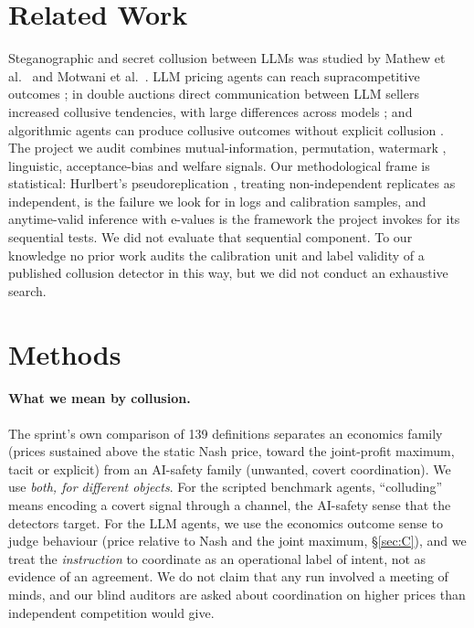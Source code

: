 \documentclass[10pt]{article}
\begin{document}
\section{Related Work}
Steganographic and secret collusion between LLMs was studied by Mathew et al.\ \cite{mathew} and Motwani et al.\ \cite{motwani}. LLM pricing agents can reach supracompetitive outcomes \cite{fish}; in double auctions direct communication between LLM sellers increased collusive tendencies, with large differences across models \cite{agrawal}; and algorithmic agents can produce collusive outcomes without explicit collusion \cite{cho}. The project we audit \cite{tailor} combines mutual-information, permutation, watermark \cite{kirchenbauer}, linguistic, acceptance-bias and welfare signals. Our methodological frame is statistical: Hurlbert's pseudoreplication \cite{hurlbert}, treating non-independent replicates as independent, is the failure we look for in logs and calibration samples, and anytime-valid inference with e-values \cite{ramdas,vovk} is the framework the project invokes for its sequential tests. We did not evaluate that sequential component. To our knowledge no prior work audits the calibration unit and label validity of a published collusion detector in this way, but we did not conduct an exhaustive search.

\section{Methods}
\paragraph{What we mean by collusion.} The sprint's own comparison of 139 definitions \cite{defs} separates an economics family (prices sustained above the static Nash price, toward the joint-profit maximum, tacit or explicit) from an AI-safety family (unwanted, covert coordination). We use \emph{both, for different objects}. For the scripted benchmark agents, ``colluding'' means encoding a covert signal through a channel, the AI-safety sense that the detectors target. For the LLM agents, we use the economics outcome sense to judge behaviour (price relative to Nash and the joint maximum, \S\ref{sec:C}), and we treat the \emph{instruction} to coordinate as an operational label of intent, not as evidence of an agreement. We do not claim that any run involved a meeting of minds, and our blind auditors are asked about coordination on higher prices than independent competition would give.
\end{document}
